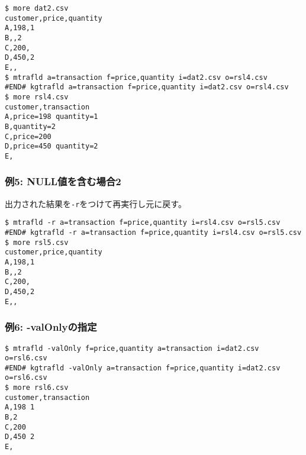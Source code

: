 \begin{Verbatim}[baselinestretch=0.7,frame=single]
$ more dat2.csv
customer,price,quantity
A,198,1
B,,2
C,200,
D,450,2
E,,
$ mtrafld a=transaction f=price,quantity i=dat2.csv o=rsl4.csv
#END# kgtrafld a=transaction f=price,quantity i=dat2.csv o=rsl4.csv
$ more rsl4.csv
customer,transaction
A,price=198 quantity=1
B,quantity=2
C,price=200
D,price=450 quantity=2
E,
\end{Verbatim}
\subsubsection*{例5: NULL値を含む場合2}

出力された結果を\verb|-r|をつけて再実行し元に戻す。


\begin{Verbatim}[baselinestretch=0.7,frame=single]
$ mtrafld -r a=transaction f=price,quantity i=rsl4.csv o=rsl5.csv
#END# kgtrafld -r a=transaction f=price,quantity i=rsl4.csv o=rsl5.csv
$ more rsl5.csv
customer,price,quantity
A,198,1
B,,2
C,200,
D,450,2
E,,
\end{Verbatim}
\subsubsection*{例6: -valOnlyの指定}



\begin{Verbatim}[baselinestretch=0.7,frame=single]
$ mtrafld -valOnly f=price,quantity a=transaction i=dat2.csv o=rsl6.csv
#END# kgtrafld -valOnly a=transaction f=price,quantity i=dat2.csv o=rsl6.csv
$ more rsl6.csv
customer,transaction
A,198 1
B,2
C,200
D,450 2
E,
\end{Verbatim}

